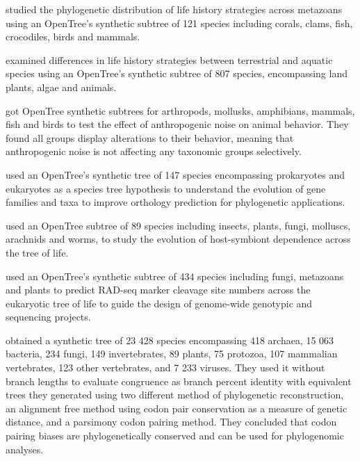 \documentclass[oupdraft]{sysbio_sse}
\begin{document}
\citep{healy2019animal} studied the phylogenetic distribution of life history strategies across metazoans
using an OpenTree's synthetic subtree of 121 species including corals, clams,
fish, crocodiles, birds and mammals.

\citep{capdevila2020longevity} examined differences in life history strategies between
terrestrial and aquatic species using an OpenTree's synthetic subtree of 807 species,
encompassing land plants, algae and animals.

\citep{kunc2019effects} got OpenTree synthetic subtrees for arthropods, mollusks,
amphibians, mammals, fish and birds to test the effect of anthropogenic noise on
animal behavior. They found all groups display alterations to their behavior, meaning
that anthropogenic noise is not affecting any taxonomic groups selectively.

\citep{boeckmann2015quest} used an OpenTree's synthetic tree of 147 species encompassing
prokaryotes and eukaryotes as a species tree hypothesis to understand the evolution
of gene families and taxa to improve orthology prediction for phylogenetic applications.

\citep{fisher2017evolution} used an OpenTree subtree of 89 species including insects, plants,
fungi, molluscs, arachnids and worms, to study the evolution of host-symbiont
dependence across the tree of life.

\citep{herrera2015predicting} used an OpenTree's synthetic subtree of 434 species
including fungi, metazoans and plants to predict RAD-seq marker cleavage site numbers
across the eukaryotic tree of life to guide the design of genome-wide genotypic and
sequencing projects.

\citep{miller2020codonpairs} obtained a synthetic tree of 23 428 species encompassing
418 archaea, 15 063 bacteria, 234 fungi, 149 invertebrates, 89 plants, 75 protozoa,
107 mammalian vertebrates, 123 other vertebrates, and 7 233 viruses.
They used it without branch lengths to evaluate congruence as branch percent identity
with equivalent trees they generated using two different method of phylogenetic reconstruction,
an alignment free method using codon pair conservation as a measure of genetic distance,
 and a parsimony codon pairing method.
 They concluded that codon pairing biases are phylogenetically conserved and can
 be used for phylogenomic analyses.
\end{document}
